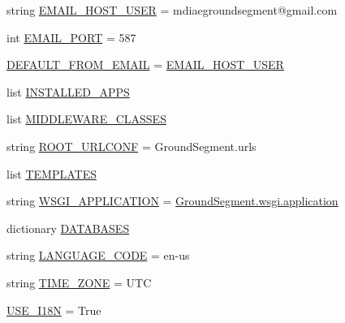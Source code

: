 \begin{DoxyCompactItemize}
string \hyperlink{namespace_ground_segment_1_1settings_a0bc4395f3eefc35a5ad7741002256650}{E\+M\+A\+I\+L\+\_\+\+H\+O\+S\+T\+\_\+\+U\+S\+E\+R} = \textquotesingle{}mdiaegroundsegment@gmail.\+com\textquotesingle{}
\item 
int \hyperlink{namespace_ground_segment_1_1settings_af36bc449cf8894642e0ceabe6b668810}{E\+M\+A\+I\+L\+\_\+\+P\+O\+R\+T} = 587
\item 
\hyperlink{namespace_ground_segment_1_1settings_ac016a8ca7717627c7aa8538920482b88}{D\+E\+F\+A\+U\+L\+T\+\_\+\+F\+R\+O\+M\+\_\+\+E\+M\+A\+I\+L} = \hyperlink{namespace_ground_segment_1_1settings_a0bc4395f3eefc35a5ad7741002256650}{E\+M\+A\+I\+L\+\_\+\+H\+O\+S\+T\+\_\+\+U\+S\+E\+R}
\item 
list \hyperlink{namespace_ground_segment_1_1settings_a87e988a27e0909411e0d3111b409f128}{I\+N\+S\+T\+A\+L\+L\+E\+D\+\_\+\+A\+P\+P\+S}
\item 
list \hyperlink{namespace_ground_segment_1_1settings_abd392b70ea7895ec177a28651e7616c8}{M\+I\+D\+D\+L\+E\+W\+A\+R\+E\+\_\+\+C\+L\+A\+S\+S\+E\+S}
\item 
string \hyperlink{namespace_ground_segment_1_1settings_af881d9abde1eaf859b6067764a32059a}{R\+O\+O\+T\+\_\+\+U\+R\+L\+C\+O\+N\+F} = \textquotesingle{}Ground\+Segment.\+urls\textquotesingle{}
\item 
list \hyperlink{namespace_ground_segment_1_1settings_aef52073a71704189e79714d515ba3de3}{T\+E\+M\+P\+L\+A\+T\+E\+S}
\item 
string \hyperlink{namespace_ground_segment_1_1settings_a5ae8b98baa409aa4ea87856e4114a64e}{W\+S\+G\+I\+\_\+\+A\+P\+P\+L\+I\+C\+A\+T\+I\+O\+N} = \textquotesingle{}\hyperlink{namespace_ground_segment_1_1wsgi_aeb034272175cec355b04712ebf413192}{Ground\+Segment.\+wsgi.\+application}\textquotesingle{}
\item 
dictionary \hyperlink{namespace_ground_segment_1_1settings_a73f9e9739e7dccd65add635931f4f98e}{D\+A\+T\+A\+B\+A\+S\+E\+S}
\item 
string \hyperlink{namespace_ground_segment_1_1settings_ad00a75a321dcbd00ef2dc2d0181ea4bb}{L\+A\+N\+G\+U\+A\+G\+E\+\_\+\+C\+O\+D\+E} = \textquotesingle{}en-\/us\textquotesingle{}
\item 
string \hyperlink{namespace_ground_segment_1_1settings_a7f5b157199222270cc12a900b1dbb6cc}{T\+I\+M\+E\+\_\+\+Z\+O\+N\+E} = \textquotesingle{}U\+T\+C\textquotesingle{}
\item 
\hyperlink{namespace_ground_segment_1_1settings_a58a4a6948688cc8ccf2f31d6bea3a954}{U\+S\+E\+\_\+\+I18\+N} = True
\item 

\end{DoxyCompactItemize}
